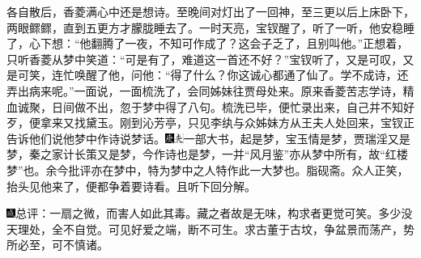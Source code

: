 各自散后，香菱满心中还是想诗。至晚间对灯出了一回神，至三更以后上床卧下，两眼鳏鳏，直到五更方才朦胧睡去了。一时天亮，宝钗醒了，听了一听，他安稳睡了，心下想：``他翻腾了一夜，不知可作成了？这会子乏了，且别叫他。''正想着，只听香菱从梦中笑道：``可是有了，难道这一首还不好？''宝钗听了，又是可叹，又是可笑，连忙唤醒了他，问他：``得了什么？你这诚心都通了仙了。学不成诗，还弄出病来呢。''一面说，一面梳洗了，会同姊妹往贾母处来。原来香菱苦志学诗，精血诚聚，日间做不出，忽于梦中得了八句。梳洗已毕，便忙录出来，自己并不知好歹，便拿来又找黛玉。刚到沁芳亭，只见李纨与众姊妹方从王夫人处回来，宝钗正告诉他们说他梦中作诗说梦话。{\includegraphics[width=3mm]{../Images/00004}\includegraphics[width=3mm]{../Images/00012}\footnotesize \kaishu 一部大书，起是梦，宝玉情是梦，贾瑞淫又是梦，秦之家计长策又是梦，今作诗也是梦，一并``风月鉴''亦从梦中所有，故``红楼梦''也。余今批评亦在梦中，特为梦中之人特作此一大梦也。脂砚斋。}众人正笑，抬头见他来了，便都争着要诗看。且听下回分解。

{\includegraphics[width=3mm]{../Images/00005}总评：一扇之微，而害人如此其毒。藏之者故是无味，构求者更觉可笑。多少没天理处，全不自觉。可见好爱之端，断不可生。求古董于古坟，争盆景而荡产，势所必至，可不慎诸。}

